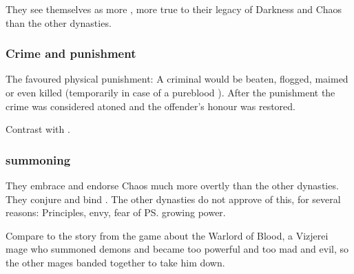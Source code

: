 They see themselves as more , more true to their legacy of Darkness and Chaos than the other dynasties. 






\subsubsection{Crime and punishment}
The \Mystraacht favoured physical punishment: 
A criminal would be beaten, flogged, maimed or even killed (temporarily in case of a pureblood \resphan). 
After the punishment the crime was considered atoned and the offender's honour was restored. 

Contrast with . 





\subsubsection{\Daemon{} summoning}
They embrace and endorse Chaos much more overtly than the other dynasties. 
They conjure and bind \daemons{}.
The other dynasties do not approve of this, for several reasons: 
Principles, envy, fear of \ps{\Mystraacht}{} growing power. 

Compare to the story from the game \cite{VideoGame:Diablo} about the Warlord of Blood, a Vizjerei mage who summoned demons and became too powerful and too mad and evil, so the other mages banded together to take him down. 

